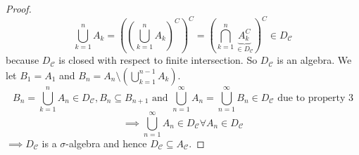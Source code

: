 \documentclass{article}
\begin{document}
\begin{proof}
  \[ \bigcup_{k=1}^n A_k = \left(\left(\bigcup_{k=1}^n A_k\right)^C\right)^C = \left(\bigcap_{k=1}^n \underbrace{A_k^C}_{\in D_{\mathcal C}}\right)^C \in D_{\mathcal C} \]
  because $D_{\mathcal C}$ is closed with respect to finite intersection.
  So $D_{\mathcal C}$ is an algebra.
  We let $B_1 = A_1$ and $B_n = A_n \setminus \left(\bigcup_{k=1}^{n-1} A_k\right)$.
  \[ B_n = \bigcup_{k=1}^n A_n \in D_{\mathcal C}, B_n \subseteq B_{n+1} \text{ and } \bigcup_{n=1}^\infty A_n = \bigcup_{n=1}^\infty B_n \in D_{\mathcal C} \text{ due to property 3} \]
  \[ \implies \bigcup_{n=1}^\infty A_n \in D_{\mathcal C} \forall A_n \in D_{\mathcal C} \]
  $\implies D_{\mathcal C}$ is a $\sigma$-algebra and hence $D_{\mathcal C} \subseteq A_{\mathcal C}$.
\end{proof}


\printindex
\end{document}
